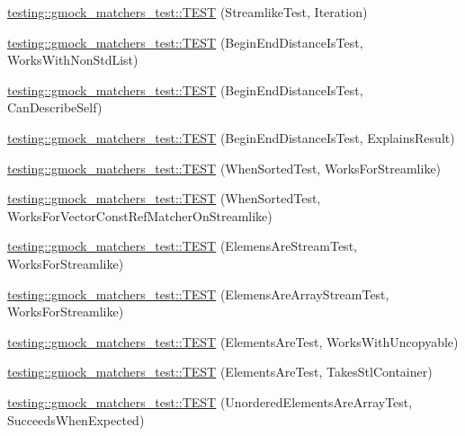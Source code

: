 \begin{DoxyCompactItemize}
\item 
\hyperlink{namespacetesting_1_1gmock__matchers__test_a5aa4eed927d4a1a8ea306d5e47dce94f}{testing\+::gmock\+\_\+matchers\+\_\+test\+::\+T\+E\+ST} (Streamlike\+Test, Iteration)
\item 
\hyperlink{namespacetesting_1_1gmock__matchers__test_add74820690e798ae8a365d08b68ddf71}{testing\+::gmock\+\_\+matchers\+\_\+test\+::\+T\+E\+ST} (Begin\+End\+Distance\+Is\+Test, Works\+With\+Non\+Std\+List)
\item 
\hyperlink{namespacetesting_1_1gmock__matchers__test_aa4ef2a94a7d75aa6116e8537deaa5f56}{testing\+::gmock\+\_\+matchers\+\_\+test\+::\+T\+E\+ST} (Begin\+End\+Distance\+Is\+Test, Can\+Describe\+Self)
\item 
\hyperlink{namespacetesting_1_1gmock__matchers__test_a89445da783c74dfa09c9c09531646f5b}{testing\+::gmock\+\_\+matchers\+\_\+test\+::\+T\+E\+ST} (Begin\+End\+Distance\+Is\+Test, Explains\+Result)
\item 
\hyperlink{namespacetesting_1_1gmock__matchers__test_a8de8e3760418cfcd33913cd30f16d117}{testing\+::gmock\+\_\+matchers\+\_\+test\+::\+T\+E\+ST} (When\+Sorted\+Test, Works\+For\+Streamlike)
\item 
\hyperlink{namespacetesting_1_1gmock__matchers__test_aa6bfe7b6cc288d93f60b9f52e095b233}{testing\+::gmock\+\_\+matchers\+\_\+test\+::\+T\+E\+ST} (When\+Sorted\+Test, Works\+For\+Vector\+Const\+Ref\+Matcher\+On\+Streamlike)
\item 
\hyperlink{namespacetesting_1_1gmock__matchers__test_adb0f512a2369d69f056e42e1cc5f3fc2}{testing\+::gmock\+\_\+matchers\+\_\+test\+::\+T\+E\+ST} (Elemens\+Are\+Stream\+Test, Works\+For\+Streamlike)
\item 
\hyperlink{namespacetesting_1_1gmock__matchers__test_a5cc317a80c3501cb7f53d07043b7270c}{testing\+::gmock\+\_\+matchers\+\_\+test\+::\+T\+E\+ST} (Elemens\+Are\+Array\+Stream\+Test, Works\+For\+Streamlike)
\item 
\hyperlink{namespacetesting_1_1gmock__matchers__test_ab403dce87c2d198a4f709d7f781d03c6}{testing\+::gmock\+\_\+matchers\+\_\+test\+::\+T\+E\+ST} (Elements\+Are\+Test, Works\+With\+Uncopyable)
\item 
\hyperlink{namespacetesting_1_1gmock__matchers__test_a290280b9e89a57833c9fc706d153b98a}{testing\+::gmock\+\_\+matchers\+\_\+test\+::\+T\+E\+ST} (Elements\+Are\+Test, Takes\+Stl\+Container)
\item 
\hyperlink{namespacetesting_1_1gmock__matchers__test_adb7e47654f1536fc049243f765292825}{testing\+::gmock\+\_\+matchers\+\_\+test\+::\+T\+E\+ST} (Unordered\+Elements\+Are\+Array\+Test, Succeeds\+When\+Expected)

\end{DoxyCompactItemize}
